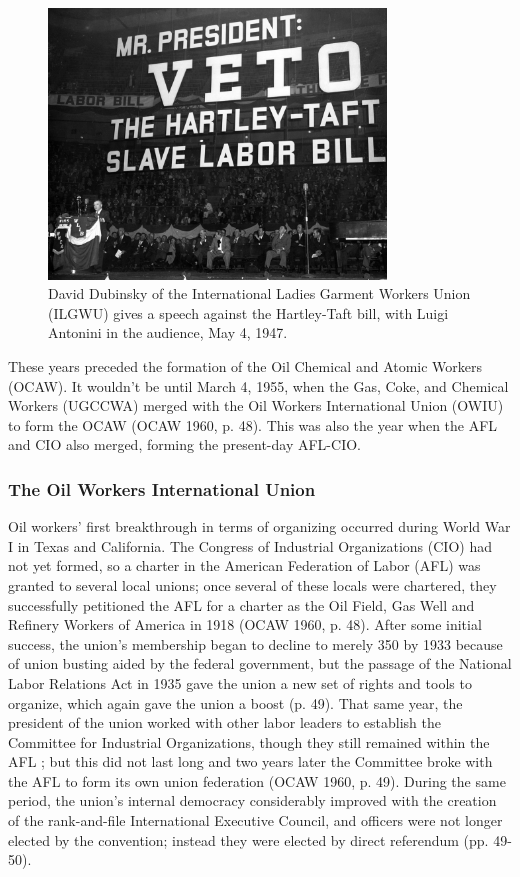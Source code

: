 \begin{figure}
  \centering
  \includegraphics[width=0.8\textwidth]{images/slave_labor_bill}
  \captionsetup{justification=centering, singlelinecheck=false, margin=2cm} 
  \caption{David Dubinsky of the International Ladies Garment Workers Union (ILGWU) gives a speech against the Hartley-Taft bill, with Luigi Antonini in the audience, May 4, 1947.}
  \label{fig:slave_labor_bill}
\end{figure}

These years preceded the formation of the Oil Chemical and Atomic Workers (OCAW). It wouldn’t be until March 4, 1955, when the Gas, Coke, and Chemical Workers (UGCCWA) merged with the Oil Workers International Union (OWIU) to form the OCAW (OCAW 1960, p. 48). This was also the year when the AFL and CIO also merged, forming the present-day AFL-CIO.

\subsubsection{The Oil Workers International Union}

Oil workers’ first breakthrough in terms of organizing occurred during World War I in Texas and California. The Congress of Industrial Organizations (CIO) had not yet formed, so a charter in the American Federation of Labor (AFL) was granted to several local unions; once several of these locals were chartered, they successfully petitioned the AFL for a charter as the Oil Field, Gas Well and Refinery Workers of America in 1918 (OCAW 1960, p. 48). After some initial success, the union’s membership began to decline to merely 350 by 1933 because of union busting aided by the federal government, but the passage of the National Labor Relations Act in 1935 gave the union a new set of rights and tools to organize, which again gave the union a boost (p. 49). That same year, the president of the union worked with other labor leaders to establish the Committee for Industrial Organizations, though they still remained within the AFL ; but this did not last long and two years later the Committee broke with the AFL to form its own union federation (OCAW 1960, p. 49). During the same period, the union’s internal democracy considerably improved with the creation of the rank-and-file International Executive Council, and officers were not longer elected by the convention; instead they were elected by direct referendum (pp. 49-50).

